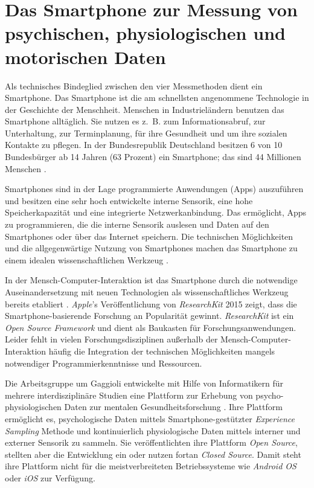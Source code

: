 \section{Das Smartphone zur Messung von psychischen, physiologischen und motorischen Daten}
\label{sec:das_smartphone_zur_messung}
Als technisches Bindeglied zwischen den vier Messmethoden dient ein Smartphone. Das Smartphone ist die am schnellsten angenommene Technologie in der Geschichte der Menschheit. Menschen in Industrieländern benutzen das Smartphone alltäglich. Sie nutzen es z.~B. zum Informationsabruf, zur Unterhaltung, zur Terminplanung, für ihre Gesundheit und um ihre sozialen Kontakte zu pflegen. In der Bundesrepublik Deutschland besitzen 6 von 10 Bundesbürger ab 14 Jahren (63 Prozent) ein Smartphone; das sind 44 Millionen Menschen \citep[vgl.][]{bitkom2015}.

Smartphones sind in der Lage programmierte Anwendungen (Apps) auszuführen und besitzen eine sehr hoch entwickelte interne Sensorik, eine hohe Speicherkapazität und eine integrierte Netzwerkanbindung. Das ermöglicht, Apps zu programmieren, die die interne Sensorik auslesen und Daten auf den Smartphones oder über das Internet speichern. Die technischen Möglichkeiten und die allgegenwärtige Nutzung von Smartphones machen das Smartphone zu einem idealen wissenschaftlichen Werkzeug \citep[vgl.][]{Raento2009}.

In der Mensch-Computer-Interaktion ist das Smartphone durch die notwendige Auseinandersetzung mit neuen Technologien als wissenschaftliches Werkzeug bereits etabliert \citep{Froehlich2007}. \emph{Apple}'s Veröffentlichung von \emph{ResearchKit} 2015 zeigt, dass die Smartphone-basierende Forschung an Popularität gewinnt. \emph{ResearchKit} ist ein \emph{Open Source Framework} und dient als Baukasten für Forschungsanwendungen. Leider fehlt in vielen Forschungsdisziplinen außerhalb der Mensch-Computer-Interaktion häufig die Integration der technischen Möglichkeiten mangels notwendiger Programmierkenntnisse und Ressourcen.

Die Arbeitsgruppe um Gaggioli entwickelte mit Hilfe von Informatikern für mehrere interdisziplinäre Studien eine Plattform zur Erhebung von psycho-physiologischen Daten zur mentalen Gesundheitsforschung \citep{Gaggioli2013}. Ihre Plattform ermöglicht es, psychologische Daten mittels Smartphone-gestützter \emph{Experience Sampling} Methode und kontinuierlich physiologische Daten mittels interner und externer Sensorik zu sammeln. Sie veröffentlichten ihre Plattform \emph{Open Source}, stellten aber die Entwicklung ein oder nutzen fortan \emph{Closed Source}. Damit steht ihre Plattform nicht für die meistverbreiteten Betriebssysteme wie \emph{Android OS} oder \emph{iOS} zur Verfügung.

